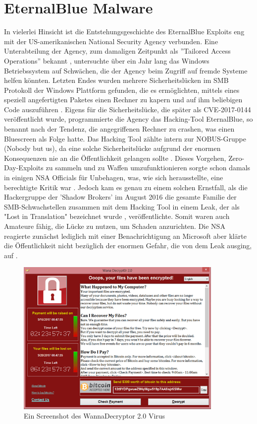 \documentclass[DIV=12,headings=normal,pdftex,headinclude=false,footinclude=false,final]{scrreprt}
\begin{document}
\chapter{EternalBlue Malware}
In vielerlei Hinsicht ist die Entstehungsgeschichte des EternalBlue Exploits eng mit der US-amerikanischen National Security Agency verbunden. Eine Unterabteilung der Agency, zum damaligen Zeitpunkt als ''Tailored Access Operations'' bekannt \cite{CS}, untersuchte über ein Jahr lang das Windows Betriebssystem auf Schwächen, die der Agency beim Zugriff auf fremde Systeme helfen könnten\cite{WP}. Letzten Endes wurden mehrere Sicherheitslücken im SMB Protokoll der Windows Plattform gefunden, die es ermöglichten, mittels eines speziell angefertigten Paketes einen Rechner zu kapern und auf ihm beliebigen Code auszuführen \cite{Avast}.
Eigens für die Sicherheitslücke, die später als CVE-2017-0144 veröffentlicht wurde, programmierte die Agency das Hacking-Tool EternalBlue, so benannt nach der Tendenz, die angegriffenen Rechner zu crashen, was einen Bluescreen als Folge hatte. Das Hacking Tool zählte intern zur NOBUS-Gruppe (Nobody but us), da eine solche Sicherheitslücke aufgrund der enormen Konsequenzen nie an die Öffentlichkeit gelangen sollte \cite{CS}. Dieses Vorgehen, Zero-Day-Exploits zu sammeln und zu Waffen umzufunktionieren sorgte schon damals in einigen NSA Officials für Unbehagen, was, wie sich herausstellte, eine berechtigte Kritik war \cite{WP}.
Jedoch kam es genau zu einem solchen Ernstfall, als die Hackergruppe der 'Shadow Brokers' im August 2016 die gesamte Familie der SMB-Schwachstellen zusammen mit dem Hacking Tool in einem Leak, der als "Lost in Translation" bezeichnet wurde \cite{Medium:ExpBible}, veröffentlichte. Somit waren auch Amateure fähig, die Lücke zu nutzen, um Schaden anzurichten. Die NSA reagierte zunächst lediglich mit einer Benachrichtigung an Microsoft aber klärte die Öffentlichkeit nicht bezüglich der enormen Gefahr, die von dem Leak ausging, auf \cite{WP}.

\begin{figure}[H]
    \centering
    \includegraphics[width=10cm]{wanna_decrypt0r_2.0.png}
    \caption[WannaDecryptor Screenshot (SecureList) URL: \url{securelist.com/wannacry-ransomware-used-in-widespread-attacks-all-over-the-world/78351/}]{Ein Screenshot des  WannaDecryptor 2.0 Virus}
    \label{img:wanna_decrypt0r}
\end{figure}
\end{document}

